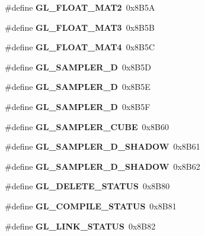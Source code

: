 \begin{DoxyCompactItemize}
\item 
\#define {\bfseries G\+L\+\_\+\+F\+L\+O\+A\+T\+\_\+\+M\+A\+T2}~0x8\+B5\+A\label{_s_d_l__opengl_8h_ab66c332d55f70b7fe36640d49235a7d7}

\item 
\#define {\bfseries G\+L\+\_\+\+F\+L\+O\+A\+T\+\_\+\+M\+A\+T3}~0x8\+B5\+B\label{_s_d_l__opengl_8h_a61fcf58656eb22c75d2353e091458e0f}

\item 
\#define {\bfseries G\+L\+\_\+\+F\+L\+O\+A\+T\+\_\+\+M\+A\+T4}~0x8\+B5\+C\label{_s_d_l__opengl_8h_af2f9eda8aec4c169cf1800b61ead61fb}

\item 
\#define {\bfseries G\+L\+\_\+\+S\+A\+M\+P\+L\+E\+R\+\_\+D}~0x8\+B5\+D\label{_s_d_l__opengl_8h_a2d29ae66c897d44f3da8b8384a097d04}

\item 
\#define {\bfseries G\+L\+\_\+\+S\+A\+M\+P\+L\+E\+R\+\_\+D}~0x8\+B5\+E\label{_s_d_l__opengl_8h_a166645e482b60d35b1d31c2f6f378238}

\item 
\#define {\bfseries G\+L\+\_\+\+S\+A\+M\+P\+L\+E\+R\+\_\+D}~0x8\+B5\+F\label{_s_d_l__opengl_8h_acbaf67c05cdb5290f748c28ca878e537}

\item 
\#define {\bfseries G\+L\+\_\+\+S\+A\+M\+P\+L\+E\+R\+\_\+\+C\+U\+B\+E}~0x8\+B60\label{_s_d_l__opengl_8h_aefd2fef024ff66a2823dfdc1639fb6ad}

\item 
\#define {\bfseries G\+L\+\_\+\+S\+A\+M\+P\+L\+E\+R\+\_\+D\+\_\+\+S\+H\+A\+D\+O\+W}~0x8\+B61\label{_s_d_l__opengl_8h_a457fd2d13b374061ad772e310fb7d04a}

\item 
\#define {\bfseries G\+L\+\_\+\+S\+A\+M\+P\+L\+E\+R\+\_\+D\+\_\+\+S\+H\+A\+D\+O\+W}~0x8\+B62\label{_s_d_l__opengl_8h_ae021158f10f94bab8f7d9349f90891e5}

\item 
\#define {\bfseries G\+L\+\_\+\+D\+E\+L\+E\+T\+E\+\_\+\+S\+T\+A\+T\+U\+S}~0x8\+B80\label{_s_d_l__opengl_8h_ae8d346453bb18046e6bb687b6006c41b}

\item 
\#define {\bfseries G\+L\+\_\+\+C\+O\+M\+P\+I\+L\+E\+\_\+\+S\+T\+A\+T\+U\+S}~0x8\+B81\label{_s_d_l__opengl_8h_a8b14cf3c9445c50aabe5c7d21b31d215}

\item 
\#define {\bfseries G\+L\+\_\+\+L\+I\+N\+K\+\_\+\+S\+T\+A\+T\+U\+S}~0x8\+B82\label{_s_d_l__opengl_8h_ae644ef6b281c9378fa49d9b1ccefaf31}


\end{DoxyCompactItemize}
